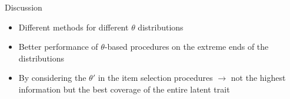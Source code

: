 \documentclass[final,t]{beamer}
\begin{document}
\begin{frame}
\begin{columns}[t]
\begin{column}{.45\linewidth}
				\begin{block}{Discussion}
					\begin{itemize}
						\item Different methods for different $\theta$ distributions
						
						\item  Better performance of $\theta$-based procedures on the extreme ends of the distributions
						
						\item By considering the $\theta'$ in the item selection procedures $\rightarrow$ not the highest information but the best coverage of the entire latent trait
					\end{itemize}

				\end{block}
			
	
				
			\end{column}
		\end{columns}
		
		
	\end{frame}
	
\end{document}
